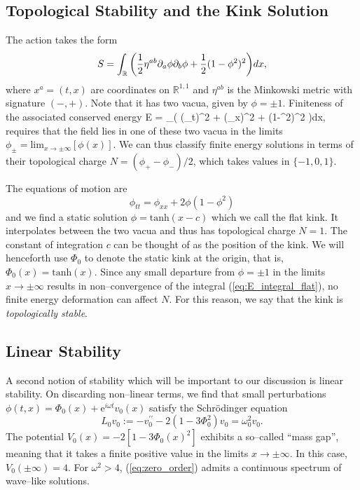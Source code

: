 \subsection{Topological Stability and the Kink Solution}
The action takes the form
\[
S=\int_{\mathbb{R}}\bigg( \frac{1}{2}\eta^{ab}\partial_a\phi\partial_b\phi + \frac{1}{2}(1-\phi^2)^2\bigg)dx,
\]
where $x^a=(t,x)$ are coordinates on $\mathbb{R}^{1,1}$ and $\eta^{ab}$ is the Minkowski metric with signature $(-,+)$. Note that it has two vacua, given by $\phi=\pm 1$. Finiteness of the associated conserved energy
\be \label{eq:E_integral_flat}
E = \int_\R \bigg( (\phi_t)^2 + (\phi_x)^2 + (1-\phi^2)^2 \bigg)dx,
\ee
requires that the field lies in one of these two vacua in the limits $\phi_\pm=\mathrm{lim}_{x\rightarrow \pm \infty}[\phi(x)]$. We can thus classify finite energy solutions in terms of their topological charge $N = (\phi_+-\phi_-)/2$, which takes values in $\{-1,0,1\}$.




The equations of motion are
\begin{equation}
\label{eom:R11}
\phi_{tt}=\phi_{xx} + 2\phi(1-\phi^2)
\end{equation}
and we find a static solution $\phi=\mathrm{tanh}(x-c)$ which we call the flat kink. It interpolates between the two vacua and thus has topological charge $N=1$. The constant of integration $c$ can be thought of as the position of the kink. We will henceforth use $\Phi_0$ to denote the static kink at the origin, that is, $\Phi_0(x)=\mathrm{tanh}(x)$. Since any small departure from $\phi=\pm 1$ in the limits $x\rightarrow\pm\infty$ results in non--convergence of the integral (\ref{eq:E_integral_flat}), no finite energy deformation can affect $N$. For this reason, we say that the kink is \textit{topologically stable}. 

\subsection{Linear Stability}

A second notion of stability which will be important to our discussion is linear stability. On discarding non--linear terms, we find that small perturbations $\phi(t,x)=\Phi_0(x)+\mathrm{e}^{i\omega t}v_0(x)$ satisfy the Schr\"odinger equation
\begin{equation}
\label{eq:zero_order}
L_0v_0:=-v_0^{\prime\prime} - 2(1-3\Phi_0^2)v_0 = \omega^2_0v_0.
\end{equation}
The potential $V_0(x)=-2[1-3\Phi_0(x)^2]$ exhibits a so--called ``mass gap'', meaning that it takes a finite positive value in the limits $x\rightarrow\pm\infty$. In this case, $V_0(\pm\infty)=4$. For $\omega^2>4$, (\ref{eq:zero_order}) admits a continuous spectrum of wave--like solutions.

